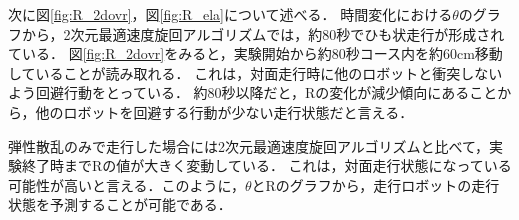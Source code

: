 \documentclass[twocolumn,dvipdfmx]{jarticle}
\begin{document}
次に図\ref{fig:R_2dovr}，図\ref{fig:R_ela}について述べる．
時間変化における$\theta$のグラフから，2次元最適速度旋回アルゴリズムでは，約80秒でひも状走行が形成されている．
図\ref{fig:R_2dovr}をみると，実験開始から約80秒コース内を約$60$cm移動していることが読み取れる．
これは，対面走行時に他のロボットと衝突しないよう回避行動をとっている．
約80秒以降だと，Rの変化が減少傾向にあることから，他のロボットを回避する行動が少ない走行状態だと言える．

弾性散乱のみで走行した場合には2次元最適速度旋回アルゴリズムと比べて，実験終了時までRの値が大きく変動している．
これは，対面走行状態になっている可能性が高いと言える．このように，$\theta$とRのグラフから，走行ロボットの走行状態を予測することが可能である．

\end{document}
